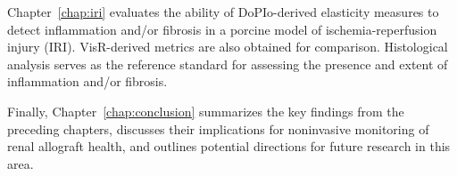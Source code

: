 Chapter~\ref{chap:iri} evaluates the ability of DoPIo-derived elasticity measures to detect inflammation and/or fibrosis in a porcine model of ischemia-reperfusion injury (IRI). VisR-derived metrics are also obtained for comparison. Histological analysis serves as the reference standard for assessing the presence and extent of inflammation and/or fibrosis.

Finally, Chapter~\ref{chap:conclusion} summarizes the key findings from the preceding chapters, discusses their implications for noninvasive monitoring of renal allograft health, and outlines potential directions for future research in this area.
